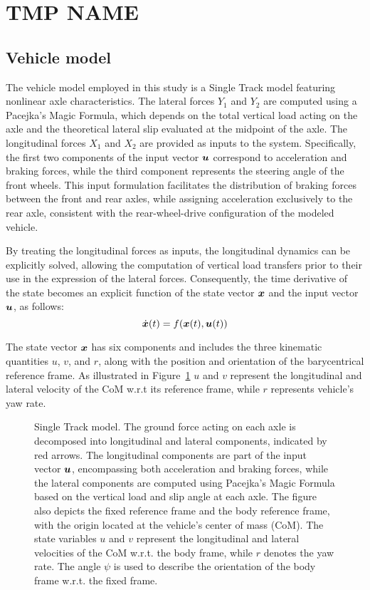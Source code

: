 \section{TMP NAME}
\label{sec:tmp}

\subsection{Vehicle model}
\label{sec:vehicle_model}
The vehicle model employed in this study is a Single Track model featuring nonlinear axle characteristics. The lateral forces $Y_1$ and $Y_2$ are computed using a Pacejka's Magic Formula, which depends on the total vertical load acting on the axle and the theoretical lateral slip evaluated at the midpoint of the axle. 
The longitudinal forces $X_1$ and $X_2$ are provided as inputs to the system. Specifically, the first two components of the input vector $\boldsymbol{u}$ correspond to acceleration and braking forces, while the third component represents the steering angle of the front wheels. This input formulation facilitates the distribution of braking forces between the front and rear axles, while assigning acceleration exclusively to the rear axle, consistent with the rear-wheel-drive configuration of the modeled vehicle. 

By treating the longitudinal forces as inputs, the longitudinal dynamics can be explicitly solved, allowing the computation of vertical load transfers prior to their use in the expression of the lateral forces. Consequently, the time derivative of the state becomes an explicit function of the state vector $\boldsymbol{x}$ and the input vector $\boldsymbol{u}$, as follows:
\begin{equation}
	\dot{\boldsymbol{x}}(t) = f(\boldsymbol{x}(t), \boldsymbol{u}(t))
\end{equation}

The state vector $\boldsymbol{x}$ has six components and includes the three kinematic quantities $u$, $v$, and $r$, along with the position and orientation of the barycentrical reference frame. As illustrated in Figure~\ref{fig:vehicle_model} $u$ and $v$ represent the longitudinal and lateral velocity of the CoM w.r.t its reference frame, while $r$ represents vehicle's yaw rate.

\begin{figure}
	\centering
	
	\caption{Single Track model. The ground force acting on each axle is decomposed into longitudinal and lateral components, indicated by red arrows. The longitudinal components are part of the input vector $\boldsymbol{u}$, encompassing both acceleration and braking forces, while the lateral components are computed using Pacejka's Magic Formula based on the vertical load and slip angle at each axle. The figure also depicts the fixed reference frame and the body reference frame, with the origin located at the vehicle's center of mass (CoM). The state variables $u$ and $v$ represent the longitudinal and lateral velocities of the CoM w.r.t. the body frame, while $r$ denotes the yaw rate. The angle $\psi$ is used to describe the orientation of the body frame w.r.t. the fixed frame.}
	\label{fig:vehicle_model}
\end{figure}

